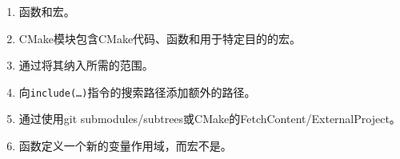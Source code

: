 

\begin{enumerate}
\item 
函数和宏。

\item
CMake模块包含CMake代码、函数和用于特定目的的宏。

\item 
通过将其纳入所需的范围。

\item 
向\texttt{include(…)}指令的搜索路径添加额外的路径。

\item 
通过使用git submodules/subtrees或CMake的FetchContent/ExternalProject。

\item 
函数定义一个新的变量作用域，而宏不是。
\end{enumerate}